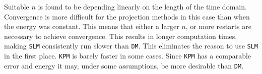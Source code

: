 \noindent Suitable $n$ is found to be depending linearly on the length of the time domain.\\

\noindent Convergence is more difficult for the projection methods in this case than when the energy was constant. This means that either a larger $n$, or more restarts are necessary to achieve convergence. This results in longer computation times,
making \texttt{SLM} consistently run slower than \texttt{DM}. This eliminates the reason to use \texttt{SLM} in the first place. \texttt{KPM} is barely faster in some cases. Since \texttt{KPM} has a comparable error and energy it may, under some assumptions, be more desirable than \texttt{DM}.

